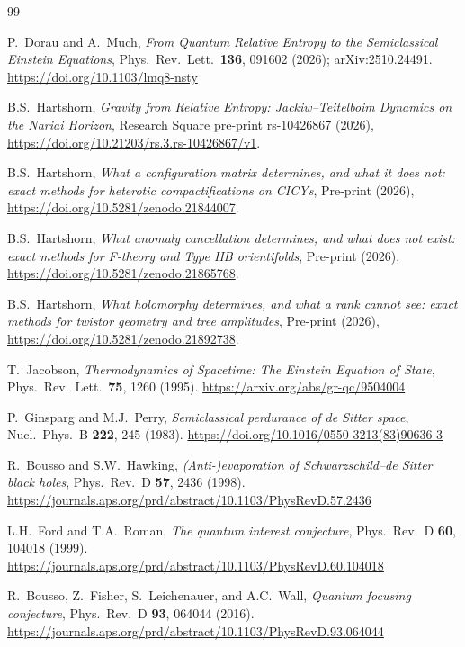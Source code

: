 \documentclass[11pt,a4paper]{article}
\theoremstyle{plain}
\theoremstyle{definition}
\begin{document}
\begin{thebibliography}{99}


P.~Dorau and A.~Much,
\emph{From Quantum Relative Entropy to the Semiclassical Einstein
Equations},
Phys.\ Rev.\ Lett.\ \textbf{136}, 091602 (2026);
arXiv:2510.24491. \url{https://doi.org/10.1103/lmq8-nsty}

B.S.~Hartshorn,
\emph{Gravity from Relative Entropy: Jackiw--Teitelboim Dynamics on the
Nariai Horizon},
Research Square pre-print rs-10426867 (2026),
\url{https://doi.org/10.21203/rs.3.rs-10426867/v1}.

B.S.~Hartshorn,
\emph{What a configuration matrix determines, and what it does not: exact
methods for heterotic compactifications on CICYs},
Pre-print (2026), \url{https://doi.org/10.5281/zenodo.21844007}.

B.S.~Hartshorn,
\emph{What anomaly cancellation determines, and what does not exist: exact
methods for F-theory and Type IIB orientifolds},
Pre-print (2026), \url{https://doi.org/10.5281/zenodo.21865768}.

B.S.~Hartshorn,
\emph{What holomorphy determines, and what a rank cannot see: exact methods
for twistor geometry and tree amplitudes},
Pre-print (2026), \url{https://doi.org/10.5281/zenodo.21892738}.

T.~Jacobson,
\emph{Thermodynamics of Spacetime: The Einstein Equation of State},
Phys.\ Rev.\ Lett.\ \textbf{75}, 1260 (1995). \url{https://arxiv.org/abs/gr-qc/9504004}

P.~Ginsparg and M.J.~Perry,
\emph{Semiclassical perdurance of de Sitter space},
Nucl.\ Phys.\ B \textbf{222}, 245 (1983). \url{https://doi.org/10.1016/0550-3213(83)90636-3}

R.~Bousso and S.W.~Hawking,
\emph{(Anti-)evaporation of Schwarzschild--de Sitter black holes},
Phys.\ Rev.\ D \textbf{57}, 2436 (1998). \url{https://journals.aps.org/prd/abstract/10.1103/PhysRevD.57.2436}

L.H.~Ford and T.A.~Roman,
\emph{The quantum interest conjecture},
Phys.\ Rev.\ D \textbf{60}, 104018 (1999). \url{https://journals.aps.org/prd/abstract/10.1103/PhysRevD.60.104018}

R.~Bousso, Z.~Fisher, S.~Leichenauer, and A.C.~Wall,
\emph{Quantum focusing conjecture},
Phys.\ Rev.\ D \textbf{93}, 064044 (2016). \url{https://journals.aps.org/prd/abstract/10.1103/PhysRevD.93.064044}


\end{thebibliography}
\end{document}
